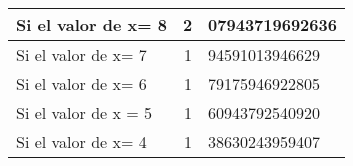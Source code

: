 
\begin{tabular}{|l | r@{,}l |}
\hline
Si el valor de x= 8  &  2 & 07943719692636\\
\hline
Si el valor de x= 7  &  1 & 94591013946629\\
\hline
Si el valor de x= 6  &  1 & 79175946922805\\
\hline
Si el valor de x = 5 &  1 & 60943792540920\\
\hline
Si el valor de x= 4  & 1  & 38630243959407\\

\hline
\end{tabular}
\label{tab:2}




